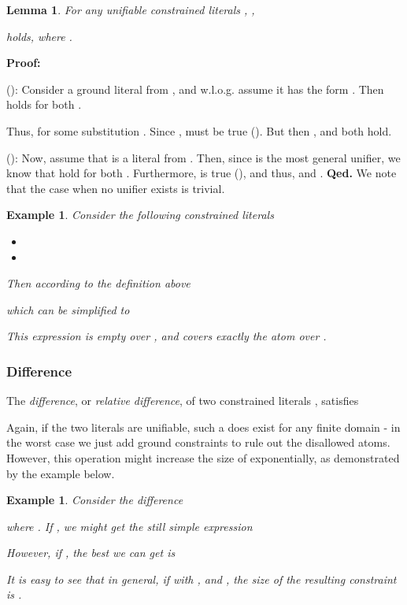 \documentclass[a4paper]{article}
\newcommand{\startproof}{{\bf Proof:~}}
\newcommand{\finishproof}{{\bf Qed.}}
\newtheorem{example}[defi]{Example}
\newtheorem{lemm}[defi]{Lemma}
\begin{document}
\begin{lemm} For any unifiable constrained literals , ,

holds, where .
\end{lemm}

\noindent
\startproof 

(): Consider a ground literal from , and w.l.o.g. assume it has the form . 
Then  holds for both .

Thus,  for some substitution .  Since ,  must be true ().
But then , and  both hold.

(): Now, assume that  is a literal from .
Then, since  is the most general unifier, we know that  hold for both .
Furthermore,  is true (), and thus,  and 
.
\finishproof\leaveabit\noindent
We note that the case when no unifier exists is trivial.

\begin{example} Consider the following constrained literals
	\begin{itemize}
		\item 
		\item 
	\end{itemize}
Then according to the definition above

which can be simplified to

This expression is empty over , and covers exactly the atom  over .
\end{example}

\subsubsection*{Difference}

The  \emph{difference}, or \emph{relative difference},  of two constrained literals ,  satisfies 


Again, if the two literals are unifiable, such a  does exist for any finite domain - in the worst case we just add ground constraints to rule out the disallowed atoms.
However, this operation might increase the size of  exponentially, as demonstrated by the example below.

\begin{example}\label{a-dmcDiffEx1}
Consider the difference 

where . 
If , we might get the still simple expression 

However, if , the best we can get is 

It is easy to see that in general, if  with , and , 
the size of the resulting constraint is .
\end{example}
\end{document}
